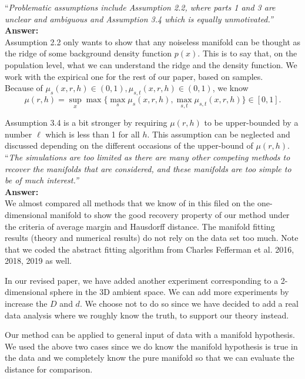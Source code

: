 \documentclass[12pt]{article}
\begin{document}
\noindent ``\textit{Problematic assumptions include Assumption 2.2, where parts 1 and 3 are unclear and ambiguous and Assumption 3.4 which is equally unmotivated.''}\\

{\bf Answer:}\\
Assumption 2.2 only wants to show that any noiseless manifold can be thought as the ridge of some background density function $p(x)$. This is to say that, on the population level, what we can understand the ridge and the density function. We work with the expirical one for the rest of our paper, based on samples.\\


Because of $\mu_s(x,r,h)\in(0,1),\mu_{s,t}(x,r,h)\in (0,1)$, we know 
\[
\mu(r,h) = \sup_x \max\{\max_s \mu_s(x,r,h), \max_{s,t}\mu_{s,t}(x,r,h)\}\in [0,1].
\]

Assumption 3.4 is a bit stronger by requiring $\mu(r,h)$ to be upper-bounded by a number $\ell$ which is less than 1 for all $h$. This assumption can be neglected and discussed depending on the different occasions of the upper-bound of $\mu(r,h)$. \\


\noindent ``\textit{The simulations are too limited as there are many other competing methods to recover the manifolds that are considered, and these manifolds are too simple to be of much interest.'' }\\

{\bf Answer:}\\
We almost compared all methods that we know of in this filed on the one-dimensional manifold to show the good recovery property of our method under the criteria of average margin and Hausdorff distance. The manifold fitting results (theory and numerical results) do not rely on the data set too much. Note that we coded the abstract fitting algorithm from  Charles Fefferman et al. 2016, 2018, 2019 as well. 

In our revised paper, we have added another experiment corresponding to a 2-dimensional sphere in the 3D ambient space. We can add more experiments by increase the $D$ and $d$. We choose not to do so since we have decided to  add a real data analysis where we roughly know the truth, to support our theory instead. 

Our method can be applied to general input of data with a manifold hypothesis. We used the above two cases since we do know the manifold hypothesis is true in the data and we completely know the pure manifold so that we can evaluate the distance for comparison.
\end{document}
